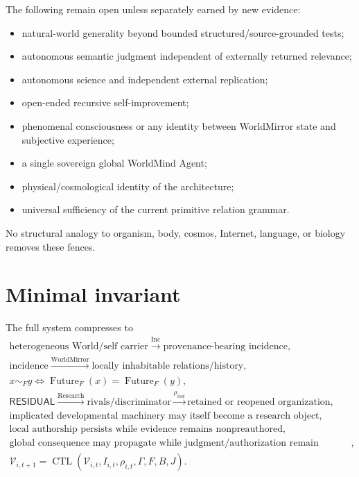 \documentclass[10pt]{article}
\theoremstyle{venus}
\theoremstyle{definition}
\newcommand{\Future}{\operatorname{Future}}
\newcommand{\Research}{\operatorname{Research}}
\newcommand{\Inc}{\operatorname{Inc}}
\newcommand{\CTL}{\operatorname{CTL}}
\newcommand{\ResidualState}{\mathsf{RESIDUAL}}
\begin{document}
The following remain open unless separately earned by new evidence:
\begin{itemize}
  \item natural-world generality beyond bounded structured/source-grounded tests;
  \item autonomous semantic judgment independent of externally returned relevance;
  \item autonomous science and independent external replication;
  \item open-ended recursive self-improvement;
  \item phenomenal consciousness or any identity between WorldMirror state and
  subjective experience;
  \item a single sovereign global WorldMind Agent;
  \item physical/cosmological identity of the architecture;
  \item universal sufficiency of the current primitive relation grammar.
\end{itemize}

No structural analogy to organism, body, cosmos, Internet, language, or biology
removes these fences.

\section{Minimal invariant}

The full system compresses to
\begin{equation}\label{eq:minimal}
\boxed{
\begin{gathered}
\text{heterogeneous World/self carrier}
\xrightarrow{\Inc}
\text{provenance-bearing incidence},\\
\text{incidence}
\xrightarrow{\text{WorldMirror}}
\text{locally inhabitable relations/history},\\
x\sim_Fy\iff\Future_F(x)=\Future_F(y),\\
\ResidualState
\xrightarrow{\Research}
\text{rivals/discriminator}
\xrightarrow{\rho_{ind}}
\text{retained or reopened organization},\\
\text{implicated developmental machinery may itself become a research object},\\
\text{local authorship persists while evidence remains nonpreauthored},\\
\text{global consequence may propagate while judgment/authorization remain indexed},\\
\mathcal V_{i,t+1}=\CTL(\mathcal V_{i,t},I_{i,t},\rho_{i,t},\Gamma,F,B,J).
\end{gathered}}
\end{equation}
\end{document}
